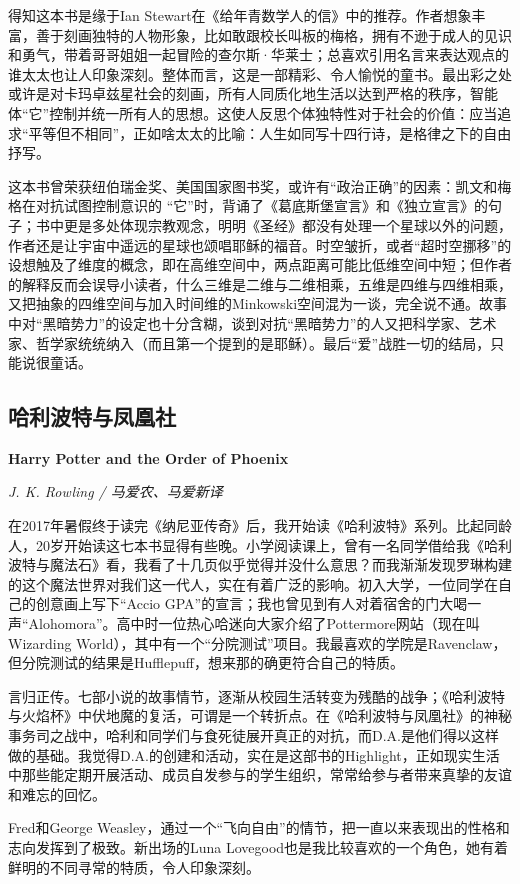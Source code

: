 \par 得知这本书是缘于Ian Stewart在《给年青数学人的信》中的推荐。作者想象丰富，善于刻画独特的人物形象，比如敢跟校长叫板的梅格，拥有不逊于成人的见识和勇气，带着哥哥姐姐一起冒险的查尔斯·华莱士；总喜欢引用名言来表达观点的谁太太也让人印象深刻。整体而言，这是一部精彩、令人愉悦的童书。最出彩之处或许是对卡玛卓兹星社会的刻画，所有人同质化地生活以达到严格的秩序，智能体“它”控制并统一所有人的思想。这使人反思个体独特性对于社会的价值：应当追求“平等但不相同”，正如啥太太的比喻：人生如同写十四行诗，是格律之下的自由抒写。
\par 这本书曾荣获纽伯瑞金奖、美国国家图书奖，或许有“政治正确”的因素：凯文和梅格在对抗试图控制意识的 “它”时，背诵了《葛底斯堡宣言》和《独立宣言》的句子；书中更是多处体现宗教观念，明明《圣经》都没有处理一个星球以外的问题，作者还是让宇宙中遥远的星球也颂唱耶稣的福音。时空皱折，或者“超时空挪移”的设想触及了维度的概念，即在高维空间中，两点距离可能比低维空间中短；但作者的解释反而会误导小读者，什么三维是二维与二维相乘，五维是四维与四维相乘，又把抽象的四维空间与加入时间维的Minkowski空间混为一谈，完全说不通。故事中对“黑暗势力”的设定也十分含糊，谈到对抗“黑暗势力”的人又把科学家、艺术家、哲学家统统纳入（而且第一个提到的是耶稣）。最后“爱”战胜一切的结局，只能说很童话。
\par {}


\subsection*{哈利波特与凤凰社}
\par \textbf{Harry Potter and the Order of Phoenix}
\par \emph{J. K. Rowling / 马爱农、马爱新译} 
\par 在2017年暑假终于读完《纳尼亚传奇》后，我开始读《哈利波特》系列。比起同龄人，20岁开始读这七本书显得有些晚。小学阅读课上，曾有一名同学借给我《哈利波特与魔法石》看，我看了十几页似乎觉得并没什么意思？而我渐渐发现罗琳构建的这个魔法世界对我们这一代人，实在有着广泛的影响。初入大学，一位同学在自己的创意画上写下“Accio GPA”的宣言；我也曾见到有人对着宿舍的门大喝一声“Alohomora”。高中时一位热心哈迷向大家介绍了Pottermore网站（现在叫Wizarding World），其中有一个“分院测试”项目。我最喜欢的学院是Ravenclaw，但分院测试的结果是Hufflepuff，想来那的确更符合自己的特质。
\par 言归正传。七部小说的故事情节，逐渐从校园生活转变为残酷的战争；《哈利波特与火焰杯》中伏地魔的复活，可谓是一个转折点。在《哈利波特与凤凰社》的神秘事务司之战中，哈利和同学们与食死徒展开真正的对抗，而D.A.是他们得以这样做的基础。我觉得D.A.的创建和活动，实在是这部书的Highlight，正如现实生活中那些能定期开展活动、成员自发参与的学生组织，常常给参与者带来真挚的友谊和难忘的回忆。
\par Fred和George Weasley，通过一个“飞向自由”的情节，把一直以来表现出的性格和志向发挥到了极致。新出场的Luna Lovegood也是我比较喜欢的一个角色，她有着鲜明的不同寻常的特质，令人印象深刻。
\par {}

